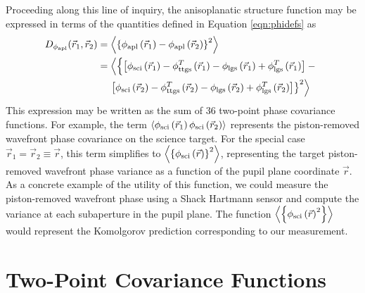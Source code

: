 Proceeding along this line of inquiry, the anisoplanatic structure
function may be expressed in terms of the quantities defined in
Equation \ref{eqn:phidefs} as
\begin{equation}\label{eqn:lgsstrfnexpansion}
\begin{split}
D_{\phi_{\rm apl}}(\vec{r}_{1},\vec{r}_{2}) & =
\left\langle \left\{\phi_{\rm apl}\left(\vec{r}_{1}\right) - 
\phi_{\rm apl}\left(\vec{r}_{2}\right)\right\}^{2}\right\rangle \\
& 
=\left\langle \left\{
\left[\phi_{\rm sci}\left(\vec{r}_{1}\right) - \phi^{T}_{\rm ttgs}\left(\vec{r}_{1}\right) - 
\phi_{\rm lgs}\left(\vec{r}_{1}\right) + \phi^{T}_{\rm lgs}\left(\vec{r}_{1}\right)\right] -
\vphantom{\left\langle\left\{\right\}^{2}\right\rangle}
\right.
\right.
\\
& \quad
\left.
\left.
\left[\phi_{\rm sci}\left(\vec{r}_{2}\right) - \phi^{T}_{\rm ttgs}\left(\vec{r}_{2}\right) - 
\phi_{\rm lgs}\left(\vec{r}_{2}\right) + \phi^{T}_{\rm lgs}\left(\vec{r}_{2}\right)\right]
\right\}^{2}\right\rangle  
\end{split}
\end{equation}
This expression may be written as the sum of 36 two-point phase
covariance functions.  For example, the term $\left\langle\phi_{\rm
  sci}\left(\vec{r}_{1}\right)\phi_{\rm
  sci}\left(\vec{r}_{2}\right)\right\rangle$ represents the
piston-removed wavefront phase covariance on the science target.  
For the special
case $\vec{r}_{1}=\vec{r}_{2}\equiv\vec{r}$, this
term simplifies to $\left\langle \left\{\phi_{\rm
  sci}\left(\vec{r}\right)\right\}^{2}\right\rangle$,
representing the target piston-removed wavefront phase variance as a
function of the pupil plane coordinate $\vec{r}$.  As a
concrete example of the utility of this function, we could measure the
piston-removed wavefront phase using a Shack Hartmann sensor and
compute the variance at each subaperture in the pupil plane.  The
function $\left\langle\left\{\phi_{\rm
  sci}\left(\vec{r}\right)^{2}\right\}\right\rangle$ would represent
the Komolgorov prediction corresponding to our measurement.

\section{Two-Point Covariance Functions}
\label{sec:covariance}

